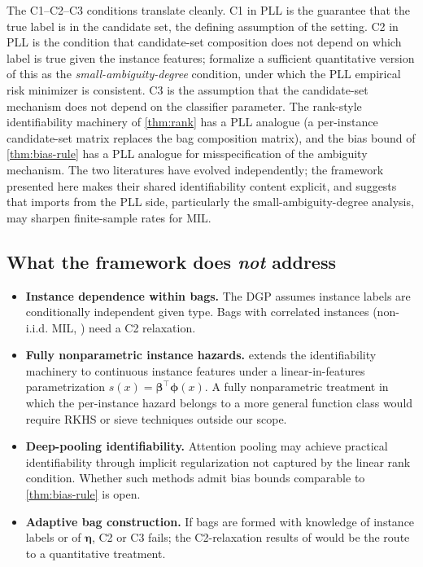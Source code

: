 The C1--C2--C3 conditions translate cleanly. C1 in PLL is the
guarantee that the true label is in the candidate set, the
defining assumption of the setting. C2 in PLL is the
condition that candidate-set composition does not depend on which
label is true given the instance features; \citet{cour2011learning}
formalize a sufficient quantitative version of this as the
\emph{small-ambiguity-degree} condition, under which the PLL
empirical risk minimizer is consistent. C3 is the assumption that
the candidate-set mechanism does not depend on the classifier
parameter. The rank-style identifiability machinery of
\cref{thm:rank} has a PLL analogue (a per-instance candidate-set
matrix replaces the bag composition matrix), and the bias bound of
\cref{thm:bias-rule} has a PLL analogue for misspecification of the
ambiguity mechanism. The two literatures have evolved
independently; the framework presented here makes their shared
identifiability content explicit, and suggests that imports from
the PLL side, particularly the small-ambiguity-degree analysis,
may sharpen finite-sample rates for MIL.

\subsection{What the framework does \emph{not} address}

\begin{itemize}
\item \textbf{Instance dependence within bags.} The DGP assumes
  instance labels are conditionally independent given type. Bags
  with correlated instances (non-i.i.d. MIL,
  \citealp{foulds2010review}) need a C2 relaxation.
\item \textbf{Fully nonparametric instance hazards.}
   extends the identifiability machinery
  to continuous instance features under a linear-in-features
  parametrization $s(x) = \bm\beta^\top \bm\phi(x)$. A fully
  nonparametric treatment in which the per-instance hazard belongs
  to a more general function class would require RKHS or sieve
  techniques outside our scope.
\item \textbf{Deep-pooling identifiability.} Attention pooling may
  achieve practical identifiability through implicit regularization
  not captured by the linear rank condition. Whether such methods
  admit bias bounds comparable to \cref{thm:bias-rule} is open.
\item \textbf{Adaptive bag construction.} If bags are formed with
  knowledge of instance labels or of $\bm{\eta}$, C2 or C3 fails;
  the C2-relaxation results of \cite{towell2026mdrelax} would be
  the route to a quantitative treatment.
\end{itemize}

